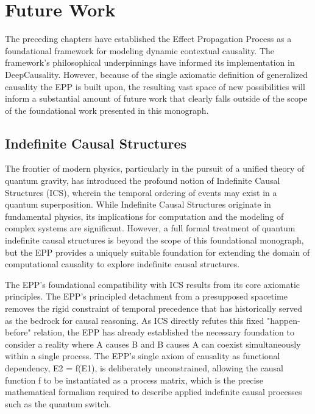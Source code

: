 \section{Future Work}
\label{sec:future_work}

The preceding chapters have established the Effect Propagation Process as a foundational framework for modeling dynamic contextual causality. The framework's philosophical underpinnings have informed its implementation in DeepCausality. However, because of the single axiomatic definition of generalized causality the EPP is built upon, the resulting vast space of new possibilities will inform a substantial amount of future work that clearly falls outside of the scope of the foundational work presented in this monograph. 


\subsection{Indefinite Causal Structures}

The frontier of modern physics, particularly in the pursuit of a unified theory of quantum gravity, has introduced the profound notion of Indefinite Causal Structures (ICS), wherein the temporal ordering of events may exist in a quantum superposition. While Indefinite Causal Structures originate in fundamental physics, its implications for computation and the modeling of complex systems are significant.  However, a full formal treatment of quantum indefinite causal structures is beyond the scope of this foundational monograph, but the EPP provides a uniquely suitable foundation for extending the domain of computational causality to explore indefinite causal structures.

The EPP’s foundational compatibility with ICS results from its core axiomatic principles. The EPP's principled detachment from a presupposed spacetime removes the rigid constraint of temporal precedence that has historically served as the bedrock for causal reasoning. As ICS directly refutes this fixed "happen-before" relation, the EPP has already established the necessary foundation to consider a reality where A causes B and B causes A can coexist simultaneously within a single process. The EPP’s single axiom of causality as functional dependency, E2 = f(E1), is deliberately unconstrained, allowing the causal function f to be instantiated as a process matrix, which is the precise mathematical formalism required to describe applied indefinite causal processes such as the quantum switch.

